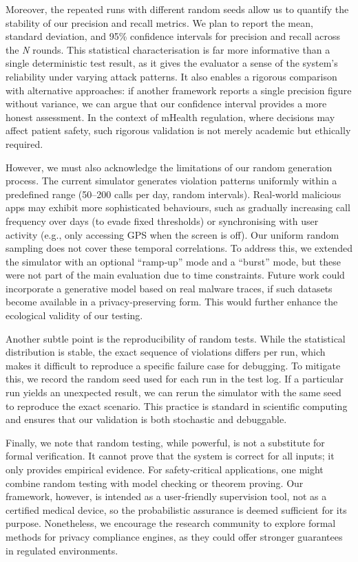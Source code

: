 Moreover, the repeated runs with different random seeds allow us to quantify the stability of our precision and recall metrics. We plan to report the mean, standard deviation, and 95\% confidence intervals for precision and recall across the \emph{N} rounds. This statistical characterisation is far more informative than a single deterministic test result, as it gives the evaluator a sense of the system's reliability under varying attack patterns. It also enables a rigorous comparison with alternative approaches: if another framework reports a single precision figure without variance, we can argue that our confidence interval provides a more honest assessment. In the context of mHealth regulation, where decisions may affect patient safety, such rigorous validation is not merely academic but ethically required.

However, we must also acknowledge the limitations of our random generation process. The current simulator generates violation patterns uniformly within a predefined range (50–200 calls per day, random intervals). Real‑world malicious apps may exhibit more sophisticated behaviours, such as gradually increasing call frequency over days (to evade fixed thresholds) or synchronising with user activity (e.g., only accessing GPS when the screen is off). Our uniform random sampling does not cover these temporal correlations. To address this, we extended the simulator with an optional ``ramp‐up'' mode and a ``burst'' mode, but these were not part of the main evaluation due to time constraints. Future work could incorporate a generative model based on real malware traces, if such datasets become available in a privacy‑preserving form. This would further enhance the ecological validity of our testing.

Another subtle point is the reproducibility of random tests. While the statistical distribution is stable, the exact sequence of violations differs per run, which makes it difficult to reproduce a specific failure case for debugging. To mitigate this, we record the random seed used for each run in the test log. If a particular run yields an unexpected result, we can rerun the simulator with the same seed to reproduce the exact scenario. This practice is standard in scientific computing and ensures that our validation is both stochastic and debuggable.

Finally, we note that random testing, while powerful, is not a substitute for formal verification. It cannot prove that the system is correct for all inputs; it only provides empirical evidence. For safety‑critical applications, one might combine random testing with model checking or theorem proving. Our framework, however, is intended as a user‑friendly supervision tool, not as a certified medical device, so the probabilistic assurance is deemed sufficient for its purpose. Nonetheless, we encourage the research community to explore formal methods for privacy compliance engines, as they could offer stronger guarantees in regulated environments.

